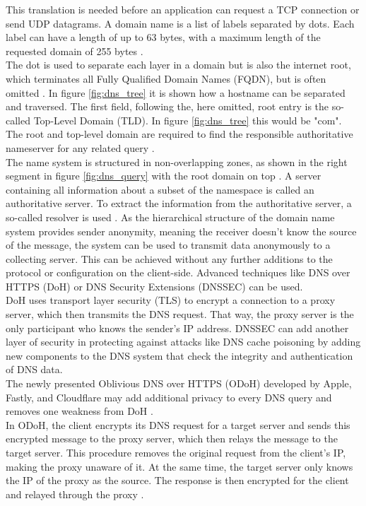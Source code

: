         This translation is needed before an application can request a TCP connection or send UDP datagrams. A domain name is a list of labels separated by dots. 
        Each label can have a length of up to 63 bytes, with a maximum length of the requested domain of 255 bytes \cite{stevens_tcpip_1993}.\\
        The dot is used to separate each layer in a domain but is also the internet root, which terminates all Fully Qualified Domain Names (FQDN), but is often omitted \cite{jeftovic_managing_2018}.
        In figure \ref{fig:dns_tree} it is shown how a hostname can be separated and traversed.
        The first field, following the, here omitted, root entry is the so-called Top-Level Domain (TLD). In figure \ref{fig:dns_tree} this would be "com". The root and top-level domain are required to find the responsible authoritative nameserver for any related query \cite{jeftovic_managing_2018}.\\

        The name system is structured in non-overlapping zones, as shown in the right segment in figure \ref{fig:dns_query} with the root domain on top \cite{herrmann_beobachtungsmoglichkeiten_2016}.
        A server containing all information about a subset of the namespace is called an authoritative server. To extract the information from the authoritative server, a so-called resolver is used \cite{friedewald_privacy_2018}.
        As the hierarchical structure of the domain name system provides sender anonymity, meaning the receiver doesn't know the source of the message, the system can be used to transmit data anonymously to a collecting server. This can be achieved without any further additions to the protocol or configuration on the client-side.
        Advanced techniques like DNS over HTTPS (DoH) \cite{ermert_cloudflare_2020} \cite{mcmanus_dns_2018} or DNS Security Extensions (DNSSEC) \cite{larson_dns_2005} can be used.\\
        DoH uses transport layer security (TLS) to encrypt a connection to a proxy server, which then transmits the DNS request. That way, the proxy server is the only participant who knows the sender's IP address. DNSSEC can add another layer of security in protecting against attacks like DNS cache poisoning by adding new components to the DNS system that check the integrity and authentication of DNS data.\\
        The newly presented Oblivious DNS over HTTPS (ODoH) developed by Apple, Fastly, and Cloudflare may add additional privacy to every DNS query and removes one weakness from DoH \cite{verma_improving_2020}.\\
        In ODoH, the client encrypts its DNS request for a target server and sends this encrypted message to the proxy server, which then relays the message to the target server. This procedure removes the original request from the client's IP, making the proxy unaware of it.
        At the same time, the target server only knows the IP of the proxy as the source. The response is then encrypted for the client and relayed through the proxy \cite{verma_improving_2020}.
        
